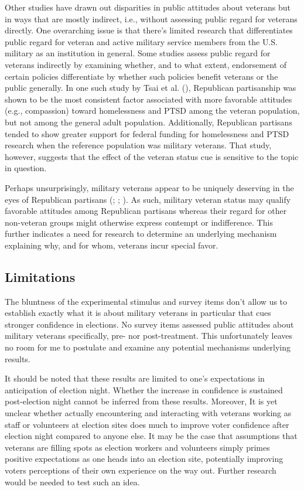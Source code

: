 \documentclass[
  12pt,
  letterpaper,
]{article}
\begin{document}
Other studies have drawn out disparities in public attitudes about
veterans but in ways that are mostly indirect, i.e., without assessing
public regard for veterans directly. One overarching issue is that
there's limited research that differentiates public regard for veteran
and active military service members from the U.S. military as an
institution in general. Some studies assess public regard for veterans
indirectly by examining whether, and to what extent, endorsement of
certain policies differentiate by whether such policies benefit veterans
or the public generally. In one such study by Tsai et al.
(), Republican partisanship was shown to be
the most consistent factor associated with more favorable attitudes
(e.g., compassion) toward homelessness and PTSD among the veteran
population, but not among the general adult population. Additionally,
Republican partisans tended to show greater support for federal funding
for homelessness and PTSD research when the reference population was
military veterans. That study, however, suggests that the effect of the
veteran status cue is sensitive to the topic in question.

Perhaps unsurprisingly, military veterans appear to be uniquely
deserving in the eyes of Republican partisans
(;
;
). As such, military veteran
status may qualify favorable attitudes among Republican partisans
whereas their regard for other non-veteran groups might otherwise
express contempt or indifference. This further indicates a need for
research to determine an underlying mechanism explaining why, and for
whom, veterans incur special favor.

\subsection{Limitations}\label{limitations}

The bluntness of the experimental stimulus and survey items don't allow
us to establish exactly what it is about military veterans in particular
that cues stronger confidence in elections. No survey items assessed
public attitudes about military veterans specifically, pre- nor
post-treatment. This unfortunately leaves no room for me to postulate
and examine any potential mechanisms underlying results.

It should be noted that these results are limited to one's expectations
in anticipation of election night. Whether the increase in confidence is
sustained post-election night cannot be inferred from these results.
Moreover, It is yet unclear whether actually encountering and
interacting with veterans working as staff or volunteers at election
sites does much to improve voter confidence after election night
compared to anyone else. It may be the case that assumptions that
veterans are filling spots as election workers and volunteers simply
primes positive expectations as one heads into an election site,
potentially improving voters perceptions of their own experience on the
way out. Further research would be needed to test such an idea.
\end{document}
